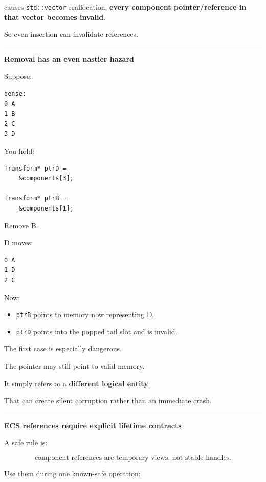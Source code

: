 causes \texttt{std::vector} reallocation, \textbf{every component pointer/reference in that vector becomes invalid}.

So even insertion can invalidate references.

\begin{center}\rule{0.5\linewidth}{0.5pt}\end{center}

\textbf{Removal has an even nastier hazard}

Suppose:

\begin{verbatim}
dense:
0 A
1 B
2 C
3 D
\end{verbatim}

You hold:

\begin{verbatim}
Transform* ptrD =
    &components[3];

Transform* ptrB =
    &components[1];
\end{verbatim}

Remove B.

D moves:

\begin{verbatim}
0 A
1 D
2 C
\end{verbatim}

Now:

\begin{itemize}
\tightlist
\item
  \texttt{ptrB} points to memory now representing D,
\item
  \texttt{ptrD} points into the popped tail slot and is invalid.
\end{itemize}

The first case is especially dangerous.

The pointer may still point to valid memory.

It simply refers to a \textbf{different logical entity}.

That can create silent corruption rather than an immediate crash.

\begin{center}\rule{0.5\linewidth}{0.5pt}\end{center}

\textbf{ECS references require explicit lifetime contracts}

A safe rule is:

\[
\boxed{
\text{component references are temporary views, not stable handles}.
}
\]

Use them during one known-safe operation:

